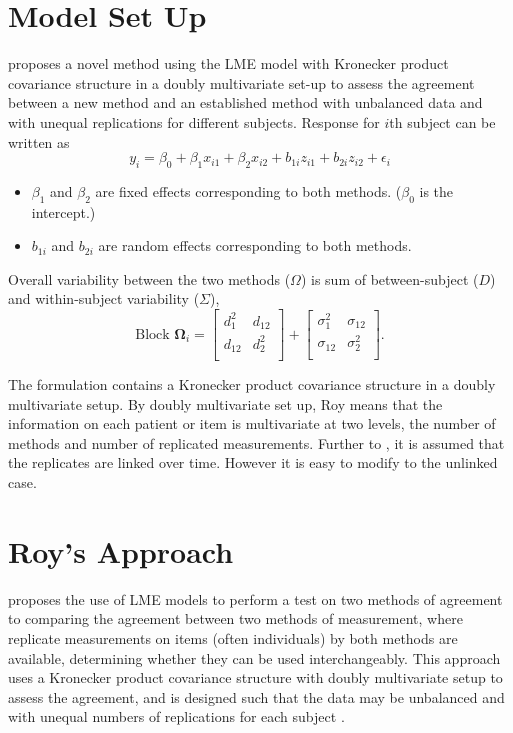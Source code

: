 \documentclass[12pt, a4paper]{report}
\theoremstyle{plain}
\theoremstyle{definition}
\theoremstyle{remark}
\begin{document}

\section{Model Set Up}

\citet{ARoy2009} proposes a novel method using the LME model with Kronecker product covariance structure in a doubly multivariate set-up to assess the agreement between a new method and an established method with unbalanced data and with unequal replications for different subjects.
Response for $i$th subject can be written as
\[ y_i = \beta_0 + \beta_1x_{i1} + \beta_2x_{i2} + b_{1i}z_{i1}  + b_{2i}z_{i2} + \epsilon_i \]
\begin{itemize}
	\item $\beta_1$ and $\beta_2$ are fixed effects corresponding to both methods. ($\beta_0$ is the intercept.)
	\item $b_{1i}$ and $b_{2i}$ are random effects corresponding to both methods.
\end{itemize}

Overall variability between the two methods ($\Omega$) is sum of between-subject ($D$) and within-subject variability ($\Sigma$),
\[
\mbox{Block } \boldsymbol{\Omega}_i = \left[ \begin{array}{cc} d^2_1 & d_{12}\\ d_{12} & d^2_2\\ \end{array} \right]
+ \left[\begin{array}{cc} \sigma^2_1 & \sigma_{12}\\ \sigma_{12} & \sigma^2_2\\ \end{array}\right].
\]
\bigskip



The formulation contains a Kronecker product covariance structure in a doubly multivariate setup. By doubly multivariate set up, Roy means that the information on each patient or item is multivariate at two levels, the number of methods and number of replicated measurements. Further to \citet{lam}, it is assumed that the replicates are linked over time. However it is easy to modify to the unlinked case.



\section{Roy's Approach}
\citet{ARoy2009} proposes the use of LME models to perform a test on two methods of agreement to comparing the agreement between two methods of measurement, where replicate measurements on items (often individuals) by both methods are available, determining whether they can be used
interchangeably. This approach uses a Kronecker product covariance structure with doubly multivariate setup to
assess the agreement, and is designed such that the data may be unbalanced and with unequal numbers of replications for each subject \citep{ARoy2009}.
\end{document}
